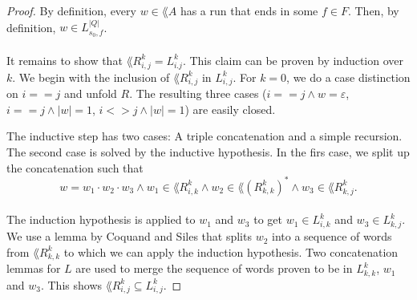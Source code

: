 \documentclass[11pt,a4paper,oneside]{book}
\begin{document}
                    \begin{proof}
                        By definition, every $w \in \lang{A}$ has a run that ends in some $f \in F$. 
                        Then, by definition, $w \in  L^{|Q|}_{s_0, f}$. 

                    \paragraph{}
                        It remains to show that $\lang{R^k_{i,j}} = L^k_{i.j}$. 
                        This claim can be proven by induction over $k$. 
                        We begin with the inclusion of $\lang{R^k_{i,j}}$ in $L^k_{i,j}$. 
                        For $k=0$, we do a case distinction on $i==j$ and unfold $R$. 
                        The resulting three cases ($i==j \wedge w=\varepsilon$, $i==j \wedge |w|=1$, $i<>j \wedge |w|=1$) are easily closed. 

                        The inductive step has two cases: A triple concatenation and a simple recursion. 
                        The second case is solved by the inductive hypothesis.
                        In the firs case, we split up the concatenation such that
                        \[
                            w = w_1 \cdot w_2 \cdot w_3 
                            \wedge w_1 \in \lang{R^k_{i,k}} 
                            \wedge w_2 \in \lang{(R^k_{k,k})^*} 
                            \wedge w_3 \in \lang{R^k_{k,j}}.
                        \]
                    \paragraph{}
                        The induction hypothesis is applied to $w_1$ and $w_3$ to get $w_1 \in L^k_{i,k}$ and $w_3 \in L^k_{k,j}$.
                        We use a lemma by Coquand and Siles that splits $w_2$ into a sequence of words from $\lang{R^k_{k,k}}$ to which we can apply the induction hypothesis. 
                        Two concatenation lemmas for $L$ are used to merge the sequence of words proven to be in $L^k_{k,k}$,
                        $w_1$ and $w_3$. This shows $\lang{R^k_{i,j}} \subseteq L^k_{i,j}$.


\end{proof}
\end{document}

